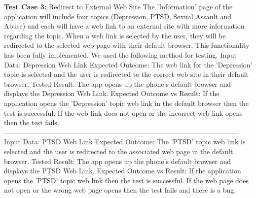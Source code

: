 \documentclass[letterpaper,12pt,titlepage]{article}
\begin{document}
\noindent
\textbf{Test Case 3:} Redirect to External Web Site %
\newline
\newline
The 'Information' page of the application will include four topics (Depression, PTSD, Sexual Assault and Abuse) and each will have a web link to an external site with more information regarding the topic. When a web link is selected by the user, they will be redirected to the selected web page with their default browser. This functionality has been fully implemented. We used the following method for testing.
\newline
\newline
Input Data: Depression Web Link
\newline
\newline
Expected Outcome: The web link for the 'Depression' topic is selected and the user is redirected to the correct web site in their default browser.
\newline
\newline
Tested Result: The app opens up the phone’s default browser and displays the Depression Web Link.
\newline
\newline
Expected Outcome vs Result: If the application opens the 'Depression' topic web link in the default browser then the test is successful. If the web link does not open or the incorrect web link opens then the test fails.
\newline
\newline
------------------------------------------------------------------------------------------------------
\newline
Input Data: PTSD Web Link
\newline
\newline
Expected Outcome: The 'PTSD' topic web link is selected and the user is redirected to the associated web page in the default browser.
\newline
\newline
Tested Result: The app opens up the phone’s default browser and displays the PTSD Web Link.
\newline
\newline
Expected Outcome vs Result: If the application opens the 'PTSD' topic web link then the test is successful. If the web page does not open or the wrong web page opens then the test fails and there is a bug.
\newline
\newline
\end{document}
